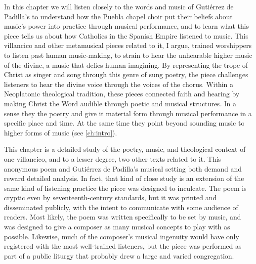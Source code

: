 In this chapter we will listen closely to the words and music of Gutiérrez de
Padilla's  to understand how the Puebla chapel
choir put their beliefs about music's power into practice through musical
performance, and to learn what this piece tells us about how Catholics in the
Spanish Empire listened to music.
This villancico and other metamusical pieces related to it, I argue, trained
worshippers to listen past human music-making, to strain to hear the unhearable
higher music of the divine, a music that defies human imagining.
By representing the trope of Christ as singer and song through this genre of
sung poetry, the piece challenges listeners to hear the divine voice through the
voices of the chorus.
Within a Neoplatonic theological tradition, these pieces connected faith and
hearing by making Christ the Word audible through poetic and musical structures.
In a sense they  the poetry and give it material form through
musical performance in a specific place and time.
At the same time they point beyond sounding music to higher forms of music (see
\cref{ch:intro}).

This chapter is a detailed study of the poetry, music, and theological context
of one villancico, and to a lesser degree, two other texts related to it.
This anonymous poem and Gutiérrez de Padilla's musical setting both demand and
reward detailed analysis.
In fact, that kind of close study is an extension of the same kind of listening
practice the piece was designed to inculcate.
The poem is cryptic even by seventeenth-century standards, but it was printed
and disseminated publicly, with the intent to communicate with some audience of
readers.
Most likely, the poem was written specifically to be set by music, and was
designed to give a composer as many musical concepts to play with as possible.
Likewise, much of the composer's musical ingenuity would have only registered
with the most well-trained listeners, but the piece was performed as part of a
public liturgy that probably drew a large and varied congregation.

